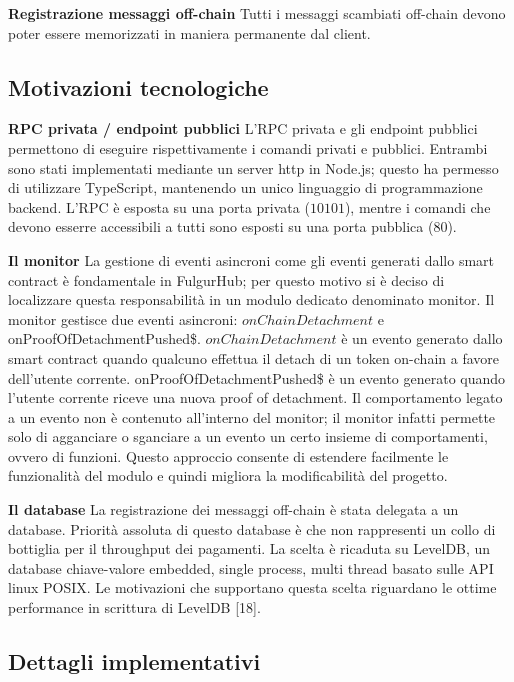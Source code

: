 \documentclass[12pt,italian,]{book}
\begin{document}
\textbf{\textbf{Registrazione messaggi off-chain}} Tutti i messaggi scambiati off-chain devono poter essere memorizzati in maniera permanente dal client.

\hypertarget{motivazioni-tecnologiche-1}{%
\subsection{Motivazioni tecnologiche}\label{motivazioni-tecnologiche-1}}

\textbf{\textbf{RPC privata / endpoint pubblici}} L'RPC privata e gli endpoint pubblici permettono di eseguire rispettivamente i comandi privati e pubblici. Entrambi sono stati implementati mediante un server http in Node.js; questo ha permesso di utilizzare TypeScript, mantenendo un unico linguaggio di programmazione backend. L'RPC è esposta su una porta privata (\(10101\)), mentre i comandi che devono esserre accessibili a tutti sono esposti su una porta pubblica (\(80\)).

\textbf{\textbf{Il monitor}} La gestione di eventi asincroni come gli eventi generati dallo smart contract è fondamentale in FulgurHub; per questo motivo si è deciso di localizzare questa responsabilità in un modulo dedicato denominato monitor. Il monitor gestisce due eventi asincroni: \(onChainDetachment\) e onProofOfDetachmentPushed\$. \(onChainDetachment\) è un evento generato dallo smart contract quando qualcuno effettua il detach di un token on-chain a favore dell'utente corrente. onProofOfDetachmentPushed\$ è un evento generato quando l'utente corrente riceve una nuova proof of detachment. Il comportamento legato a un evento non è contenuto all'interno del monitor; il monitor infatti permette solo di agganciare o sganciare a un evento un certo insieme di comportamenti, ovvero di funzioni. Questo approccio consente di estendere facilmente le funzionalità del modulo e quindi migliora la modificabilità del progetto.

\textbf{\textbf{Il database}} La registrazione dei messaggi off-chain è stata delegata a un database. Priorità assoluta di questo database è che non rappresenti un collo di bottiglia per il throughput dei pagamenti. La scelta è ricaduta su LevelDB, un database chiave-valore embedded, single process, multi thread basato sulle API linux POSIX. Le motivazioni che supportano questa scelta riguardano le ottime performance in scrittura di LevelDB {[}18{]}.

\hypertarget{dettagli-implementativi-1}{%
\subsection{Dettagli implementativi}\label{dettagli-implementativi-1}}
\end{document}
